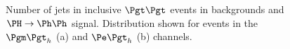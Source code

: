 \begin{figure}
\begin{center}

\end{center}
\caption[Number of jets in inclusive $\Pgt\Pgt$ events in backgrounds and
$\PH\to\Ph\Ph$ signal.]{
Number of jets in inclusive $\Pgt\Pgt$ events in backgrounds and
$\PH\to\Ph\Ph$ signal. Distribution shown for events in the $\mutau$ (a) and $\etau$
(b) channels.}
\label{fig:Hhhnjets}
\end{figure} 

